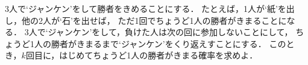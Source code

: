 \documentclass[../../main.tex]{subfiles}
\begin{document}
3人で‘ジャンケン’をして勝者をきめることにする．
たとえば，1人が‘紙’を出し，他の2人が‘石’を出せば，
ただ1回でちょうど1人の勝者がきまることになる．
3人で‘ジャンケン’をして，負けた人は次の回に参加しないことにして，
ちょうど1人の勝者がきまるまで‘ジャンケン’をくり返えすことにする．
このとき，$k$回目に，はじめてちょうど1人の勝者がきまる確率を求めよ．
\end{document}
